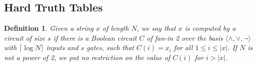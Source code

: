 \documentclass[11pt]{article}
\newtheorem{lemma}{Lemma}
\newtheorem{definition}{Definition}
\begin{document}



\subsection{Hard Truth Tables}
\begin{definition}\label{def:circ-size}
Given a string $x$ of length $N$, we say that $x$ is computed by a circuit of size $s$ if there is a Boolean circuit $C$ of fan-in 2 over the basis $\langle \land, \lor, \lnot \rangle$ with $\lceil \log N \rceil$ inputs and $s$ gates, such that $C(i)=x_i$ for all $1 \leq i \leq |x|$. If $N$ is not a power of 2, we put no restriction on the value of $C(i)$ for $i > |x|$.
\end{definition}
\end{document}
